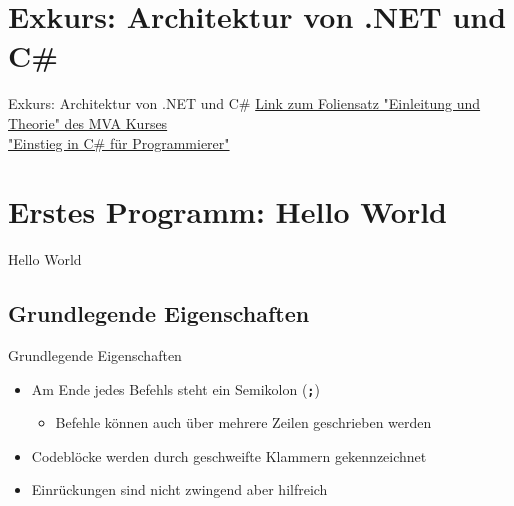 \section[Exkurs: \newline Architektur von .NET und C\#]{Exkurs:  Architektur von .NET und C\#}
\begin{frame}{Exkurs: Architektur von .NET und C\#}
	\centering
	\href{https://mva.microsoft.com/de-de/training-courses/einstieg-in-c-fr-programmierer-8826?l=MoyWcix2_1304984382}{Link zum Foliensatz "Einleitung und Theorie" des MVA Kurses \\"Einstieg in C\# für Programmierer"}
\end{frame} 

\section{Erstes Programm: Hello World}
\begin{frame}{Hello World}
       
\end{frame} 

\subsection{Grundlegende Eigenschaften}
\begin{frame}{Grundlegende Eigenschaften}
	\begin{itemize}
		\item Am Ende jedes Befehls steht ein Semikolon (\texttt{\alert{\textbf{;}}})
		\begin{itemize}
			\item Befehle können auch über mehrere Zeilen geschrieben werden
		\end{itemize}
		\item Codeblöcke werden durch geschweifte Klammern gekennzeichnet
		\item Einrückungen sind nicht zwingend aber hilfreich
	\end{itemize}
\end{frame}


